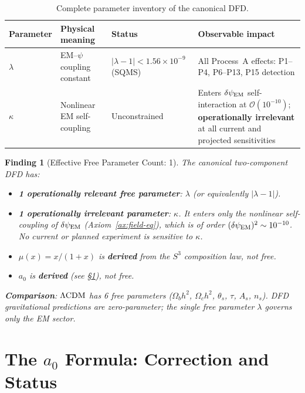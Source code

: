 \documentclass[11pt]{article}
\newtheorem{finding}{Finding}
\newcommand{\ee}[1]{\times 10^{#1}}
\newcommand{\dpsiEM}{\delta\psi_{\rm EM}}
\newcommand{\aM}{a_0}
\newcommand{\LCDM}{\Lambda{\rm CDM}}
\newcommand{\lamdiff}{|\lambda{-}1|}
\newcommand{\mufd}{\mu}
\newcommand{\order}[1]{\mathcal{O}(#1)}
\newcommand{\lambdabound}{1.56\ee{-9}}
\begin{document}
\begin{table}[H]
\centering
\caption{Complete parameter inventory of the canonical DFD.}
\label{tab:parameters}
\begin{tabular}{lp{4.5cm}lp{4cm}}
\toprule
\textbf{Parameter} & \textbf{Physical meaning} & \textbf{Status} &
\textbf{Observable impact} \\
\midrule
$\lambda$ & EM--$\psi$ coupling constant &
  $\lamdiff < \lambdabound$ (SQMS) &
  All Process~A effects: P1--P4, P6--P13, P15 detection \\
\addlinespace
$\kappa$ & Nonlinear EM self-coupling &
  Unconstrained &
  Enters $\dpsiEM$ self-interaction at $\order{10^{-10}}$;
  \textbf{operationally irrelevant} at all current and projected
  sensitivities \\
\bottomrule
\end{tabular}
\end{table}

\begin{finding}[Effective Free Parameter Count: 1]
\label{find:one-param}
The canonical two-component DFD has:
\begin{itemize}[nosep]
\item \textbf{1 operationally relevant free parameter}: $\lambda$
  (or equivalently $\lamdiff$).
\item \textbf{1 operationally irrelevant parameter}: $\kappa$.
  It enters only the nonlinear self-coupling of $\dpsiEM$
  (Axiom~\ref{ax:field-eq}), which is of order $(\dpsiEM)^2
  \sim 10^{-10}$. No current or planned experiment is sensitive to
  $\kappa$.
\item $\mufd(x) = x/(1+x)$ is \textbf{derived} from the $S^3$
  composition law, not free.
\item $\aM$ is \textbf{derived} (see \S\ref{sec:a0-correction}),
  not free.
\end{itemize}

\textbf{Comparison}: $\LCDM$ has 6 free parameters
($\Omega_b h^2$, $\Omega_c h^2$, $\theta_s$, $\tau$, $A_s$, $n_s$).
DFD gravitational predictions are \emph{zero-parameter}; the single
free parameter $\lambda$ governs only the EM sector.
\end{finding}


\section{The $\aM$ Formula: Correction and Status}
\label{sec:a0-correction}
\end{document}
